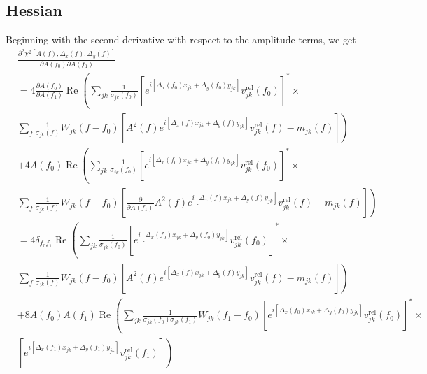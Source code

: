 \documentclass{article}
\newcommand\re{\operatorname{Re}}
\begin{document}
\subsection{Hessian}

Beginning with the second derivative with respect to the amplitude terms, we get
\begin{equation}
\begin{split}
    &\frac{\partial^2 \chi^2[A(f), \Delta_x(f), \Delta_y(f)]}{\partial A(f_0) \partial A(f_1)} \\
    & = 4 \frac{\partial A(f_0)}{\partial A(f_1)} \re \left( \sum_{jk} \frac{1}{\sigma_{jk}(f_0)} \left[ e^{i[\Delta_x(f_0) x_{jk} + \Delta_y(f_0) y_{jk}]} v^\text{rel}_{jk}(f_0) \right]^* \times \right. \\
    & \left. \sum_{f} \frac{1}{\sigma_{jk}(f)} W_{jk}(f-f_0) \left[ A^2(f) e^{i[\Delta_x(f) x_{jk} + \Delta_y(f) y_{jk}]} v^\text{rel}_{jk}(f) - m_{jk}(f) \right] \right) \\
    &+ 4 A(f_0) \re \left( \sum_{jk} \frac{1}{\sigma_{jk}(f_0)} \left[ e^{i[\Delta_x(f_0) x_{jk} + \Delta_y(f_0) y_{jk}]} v^\text{rel}_{jk}(f_0) \right]^* \times \right. \\
    & \left. \sum_{f} \frac{1}{\sigma_{jk}(f)} W_{jk}(f-f_0) \left[ \frac{\partial}{\partial A(f_1)} A^2(f) e^{i[\Delta_x(f) x_{jk} + \Delta_y(f) y_{jk}]} v^\text{rel}_{jk}(f) - m_{jk}(f) \right] \right) \\
    & = 4 \delta_{f_0 f_1} \re \left( \sum_{jk} \frac{1}{\sigma_{jk}(f_0)} \left[ e^{i[\Delta_x(f_0) x_{jk} + \Delta_y(f_0) y_{jk}]} v^\text{rel}_{jk}(f_0) \right]^* \times \right. \\
    & \left. \sum_{f} \frac{1}{\sigma_{jk}(f)} W_{jk}(f-f_0) \left[ A^2(f) e^{i[\Delta_x(f) x_{jk} + \Delta_y(f) y_{jk}]} v^\text{rel}_{jk}(f) - m_{jk}(f) \right] \right) \\
    &+ 8 A(f_0) A(f_1) \re \left( \sum_{jk} \frac{1}{\sigma_{jk}(f_0)\sigma_{jk}(f_1)} W_{jk}(f_1-f_0) \left[ e^{i[\Delta_x(f_0) x_{jk} + \Delta_y(f_0) y_{jk}]} v^\text{rel}_{jk}(f_0) \right]^* \times \right. \\
    & \left. \left[ e^{i[\Delta_x(f_1) x_{jk} + \Delta_y(f_1) y_{jk}]} v^\text{rel}_{jk}(f_1) \right] \right) \\
\end{split}
\end{equation}
\end{document}

